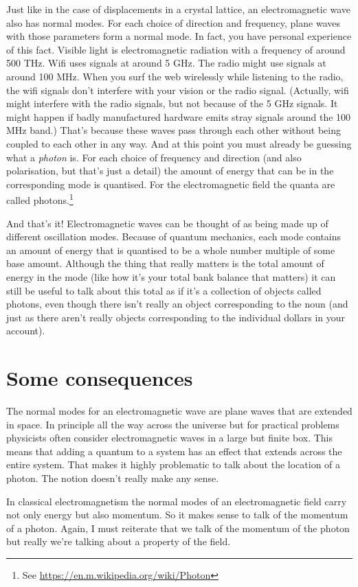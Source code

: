 \documentclass[a4paper]{article}
\begin{document}
Just like in the case of displacements in a crystal lattice, an electromagnetic wave also has normal modes.
For each choice of direction and frequency, plane waves with those parameters form a normal mode.
In fact, you have personal experience of this fact.
Visible light is electromagnetic radiation with a frequency of around 500 THz.
Wifi uses signals at around 5 GHz.
The radio might use signals at around 100 MHz.
When you surf the web wirelessly while listening to the radio, the wifi signals don't interfere with your vision or the radio signal.
(Actually, wifi might interfere with the radio signals, but not because of the 5 GHz signals. It might happen if badly manufactured hardware emits stray signals around the 100 MHz band.)
That's because these waves pass through each other without being coupled to each other in any way.
And at this point you must already be guessing what a {\em photon} is.
For each choice of frequency and direction (and also polarisation, but that's just a detail) the amount of energy that can be in the corresponding mode is quantised.
For the electromagnetic field the quanta are called photons.\footnote{See \url{https://en.m.wikipedia.org/wiki/Photon}}

And that's it!
Electromagnetic waves can be thought of as being made up of different oscillation modes.
Because of quantum mechanics, each mode contains an amount of energy that is quantised to be a whole number multiple of some base amount.
Although the thing that really matters is the total amount of energy in the mode (like how it's your total bank balance that matters) it can still be useful to talk about this total as if it's a collection of objects called photons, even though there isn't really an object corresponding to the noun (and just as there aren't really objects corresponding to the individual dollars in your account).

\section{Some consequences}
The normal modes for an electromagnetic wave are plane waves that are extended in space. In principle all the way across the universe but for practical problems physicists often consider electromagnetic waves in a large but finite box.
This means that adding a quantum to a system has an effect that extends across the entire system.
That makes it highly problematic to talk about the location of a photon.
The notion doesn't really make any sense.

In classical electromagnetism the normal modes of an electromagnetic field carry not only energy but also momentum.
So it makes sense to talk of the momentum of a photon.
Again, I must reiterate that we talk of the momentum of the photon but really we're talking about a property of the field.
\end{document}
